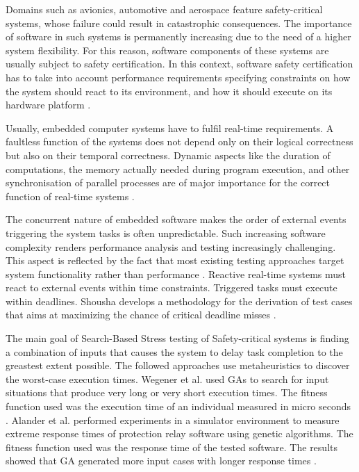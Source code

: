 \documentclass{report}
\begin{document}
Domains such as avionics, automotive and aerospace feature safety-critical systems, whose failure could result in catastrophic consequences.  The importance
of software in such systems is permanently increasing due to the need of a higher system
flexibility. For this reason, software components of these systems are usually subject to safety certification. In this context, software safety certification has to take into account performance requirements specifying constraints on how the system should react to its environment, and how it should execute on its hardware platform \cite{DiAlesio2013}.

Usually, embedded computer systems have to fulfil real-time requirements. A faultless function of the systems does not depend only on their logical correctness but also on their temporal correctness. Dynamic aspects like the duration of computations, the memory actually needed during program execution, and other synchronisation of parallel processes are of major importance for the correct function of real-time systems  \cite{J.WegenerK.GrimmM.GrochtmannH.Sthamer1996} .

The concurrent nature of embedded software makes  the order of external events triggering the system tasks is often unpredictable. Such increasing software complexity
renders performance analysis and testing increasingly
challenging. This aspect is reflected by the fact that most existing testing approaches target system functionality rather than performance \cite{DiAlesio2013}. Reactive real-time systems must react to external events within time constraints. Triggered tasks must execute within deadlines. Shousha develops a methodology for the derivation of test cases that aims at maximizing the chance of critical deadline misses \cite{shousha2003performance}. 

The main goal of Search-Based Stress testing of Safety-critical systems is finding a combination of inputs that causes the system to delay task completion to the greastest extent possible. The followed approaches use metaheuristics to discover the worst-case execution times. Wegener et al. \cite{Wegener1997} used GAs to search for input situations that produce very long or very short execution times. The fitness function used was the execution time of an individual measured in micro seconds \cite{Wegener1997}. Alander et al. \cite{Alander} performed experiments in a simulator environment to measure extreme response times of protection relay software using genetic algorithms. The fitness function used was the response time of the tested software. The results showed that GA generated more input cases with longer response times \cite{Alander}. 
\end{document}
